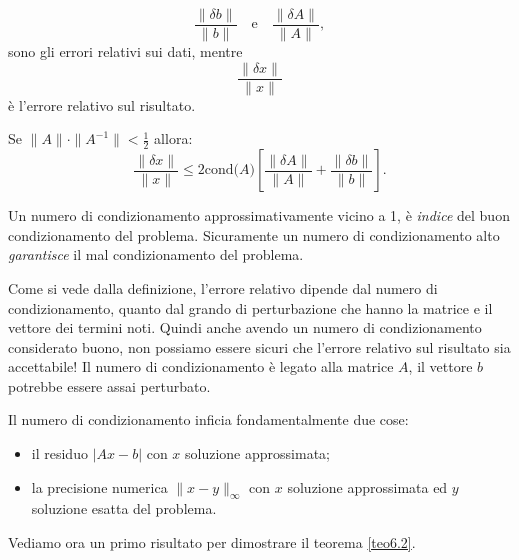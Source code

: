 \begin{osse}
\[
\frac{\|\delta b\|}{\|b\|}\quad \textrm{e}\quad \frac{\|\delta A\|}{\|A\|},
\]
sono gli errori relativi sui dati, mentre
\[ \frac{\|\delta x\|}{\|x\|} \] è l'errore relativo sul risultato.
\end{osse}

\begin{osse}
Se $\|A\|\cdot\|A^{-1}\| < \frac{1}{2}$ allora:
\[
\frac{\|\delta x\|}{\|x\|} \leq 2 \textrm{cond(}A\textrm{)}
\left[\frac{\|\delta A\|}{\|A\|} + \frac{\|\delta b\|}{\|b\|}\right].
\]
\end{osse}

\begin{osse}
Un numero di condizionamento approssimativamente vicino a 1, è \emph{indice}
del buon condizionamento del problema. Sicuramente un numero di condizionamento
alto \emph{garantisce} il mal condizionamento del problema.
\end{osse}

\begin{osse}
Come si vede dalla definizione, l'errore relativo dipende dal numero di
condizionamento, quanto dal grando di perturbazione che hanno la matrice e il
vettore dei termini noti. Quindi anche avendo un numero di condizionamento
considerato buono, non possiamo essere sicuri che l'errore relativo sul
risultato sia accettabile!
Il numero di condizionamento è legato alla matrice $A$, il vettore $b$ potrebbe
essere assai perturbato.
\end{osse}

\begin{osse}
Il numero di condizionamento inficia fondamentalmente due cose:
\begin{itemize}
\item il residuo $|Ax - b|$ con $x$ soluzione approssimata;
\item la precisione numerica $\|x-y\|_{\infty}$ con $x$ soluzione approssimata
ed $y$ soluzione esatta del problema.
\end{itemize}

\end{osse}

Vediamo ora un primo risultato per dimostrare il teorema \ref{teo6.2}.

